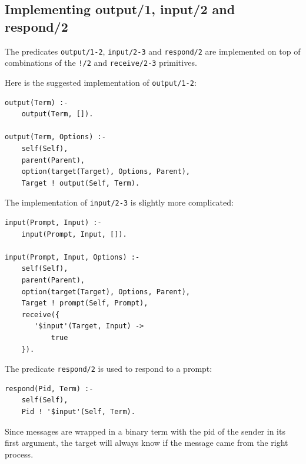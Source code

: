 \subsection{Implementing output/1, input/2 and respond/2 }

%


\noindent The predicates \texttt{output/1-2}, \texttt{input/2-3} and \texttt{respond/2} are implemented on top of combinations of the \texttt{!/2} and \texttt{receive/2-3} primitives. %

Here is the suggested implementation of \texttt{output/1-2}:

\begin{verbatim}
output(Term) :-
    output(Term, []).
   
output(Term, Options) :-
    self(Self),
    parent(Parent),
    option(target(Target), Options, Parent),
    Target ! output(Self, Term).
\end{verbatim}    

\noindent The implementation of \texttt{input/2-3} is slightly more complicated:

\begin{verbatim}
input(Prompt, Input) :-
    input(Prompt, Input, []).
    
input(Prompt, Input, Options) :-
    self(Self),
    parent(Parent),
    option(target(Target), Options, Parent),
    Target ! prompt(Self, Prompt),
    receive({ 
       '$input'(Target, Input) ->
           true
    }).
\end{verbatim}    

\noindent The predicate \texttt{respond/2} is used to respond to a prompt:

\begin{verbatim}
respond(Pid, Term) :-
    self(Self),
    Pid ! '$input'(Self, Term).
\end{verbatim}  

\noindent Since messages are wrapped in a binary term with the pid of the sender in its first argument, the target will always know if the message came from the right process.


